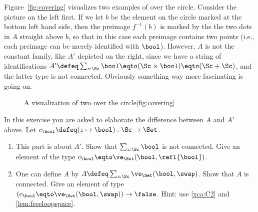 Figure~\ref{fig:covering} visualizes two examples of \coverings over the circle.
Consider the picture on the left first.
If we let $b$ be the element on the circle marked at the bottom left hand side,
then the preimage $f^{-1}(b)$ is marked by the the two dots
in $A$ straight above $b$, so that in this case each preimage contains
two points (i.e., each preimage can be merely identified with $\bool$).
However, $A$ is not the constant family, like $A'$ depicted on the right,
since we have a string of identifications
$A'\defeq\sum_{z:\Sc}\bool\eqto(\Sc\times\bool)\eqto(\Sc+\Sc)$,
and the latter type is not connected.
Obviously something way more fascinating is going on.

\begin{figure}[hbt]
  \begin{sidecaption}%
    {A visualization of two \coverings over the circle}[fig:covering]
  \centering
  \end{sidecaption}
\end{figure}

\begin{xca}\label{xca:twoS1coverings}
In this exercise you are asked to elaborate the difference
between $A$ and $A'$ above.
Let $c_\bool \defeq (z\mapsto\bool): \Sc\to\Set$.
\begin{enumerate}
\item
This part is about $A'$. Show that $\sum_{z:\Sc}\bool$ is not connected.
Give an element of the type $c_\bool\eqto\ve_\Set(\bool,\refl{\bool})$.
\item
One can define $A$ by $A\defeq\sum_{z:\Sc}\ve_\Set(\bool,\swap)$.
Show that $A$ is connected.
Give an element of type $(c_\bool\eqto\ve_\Set(\bool,\swap))\to\false$.
Hint: use \cref{xca:C2} and \cref{lem:freeloopspace}.\qedhere
\end{enumerate}
\end{xca}

